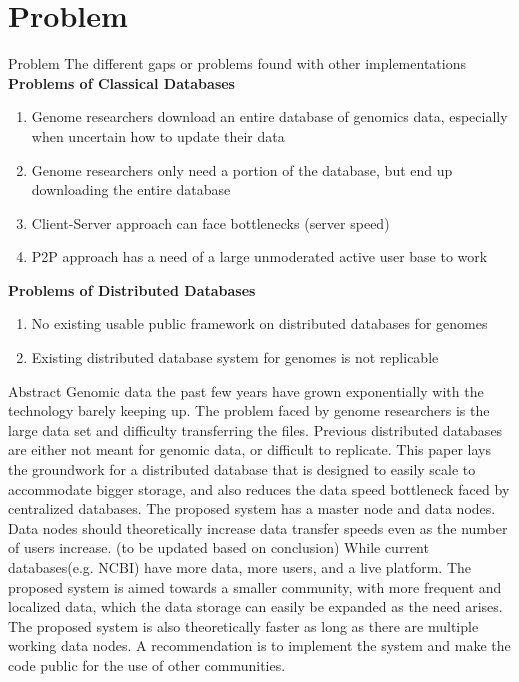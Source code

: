 \documentclass{beamer}
\begin{document}
\section{Problem}
\begin{frame}{Problem}
    The different gaps or problems found with other implementations
    \textbf{Problems of Classical Databases}
    \begin{enumerate}
        \item Genome researchers download an entire database of genomics data, especially when uncertain how to update their data
        \item Genome researchers only need a portion of the database, but end up downloading the entire database
        \item Client-Server approach can face bottlenecks (server speed)
        \item P2P approach has a need of a large unmoderated active user base to work
    \end{enumerate}
    \textbf{Problems of Distributed Databases}
    
    \begin{enumerate}
    \item No existing usable public framework on distributed databases for genomes
    \item Existing distributed database system for genomes is not replicable 
    \end{enumerate}
\end{frame}

\begin{frame}
\titlepage %
\end{frame}

\begin{frame}{Abstract}
Genomic data the past few years have grown exponentially with the technology barely keeping up. The problem faced by genome researchers is the large data set and difficulty transferring the files. Previous distributed databases are either not meant for genomic data, or difficult to replicate. This paper lays the groundwork for a distributed database that is designed to easily scale to accommodate bigger storage, and also reduces the data speed bottleneck faced by centralized databases. The proposed system has a master node and data nodes. Data nodes should theoretically increase data transfer speeds even as the number of users increase. (to be updated based on conclusion) While current databases(e.g. NCBI) have more data, more users, and a live platform. The proposed system is aimed towards a smaller community, with more frequent and localized data, which the data storage can easily be expanded as the need arises. The proposed system is also theoretically faster as long as there are multiple working data nodes. A recommendation is to implement the system and make the code public for the use of other communities.
\end{frame}
\end{document}
